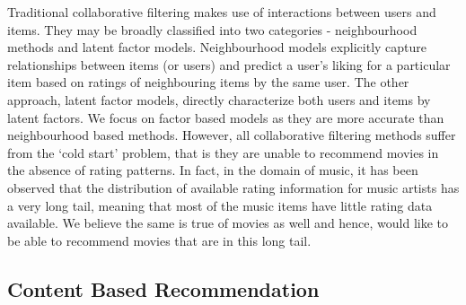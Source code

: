 \documentclass{article} %
\begin{document}
Traditional collaborative filtering makes use of interactions between users and 
items. They may be broadly classified into two categories - neighbourhood methods and latent factor models. Neighbourhood models explicitly capture relationships between items (or users) and predict a user's liking for a particular item based on ratings of neighbouring items by the same user. The other approach, latent
factor models, directly characterize both users and items by latent factors. We focus on factor based models as they are more accurate than neighbourhood based 
methods. However, all collaborative filtering methods suffer from the `cold 
start' problem, that is 
they are unable to recommend movies in the absence of rating patterns. In fact, 
in the domain of music, it has been observed \cite{music-long-tail} that the distribution of available rating information for music artists has a very long tail, meaning that most of the music items have little rating data available. We believe the same is true of movies as well and hence, would like to be able to recommend movies that are in this long tail. 


%


\subsection{Content Based Recommendation}
\end{document}
